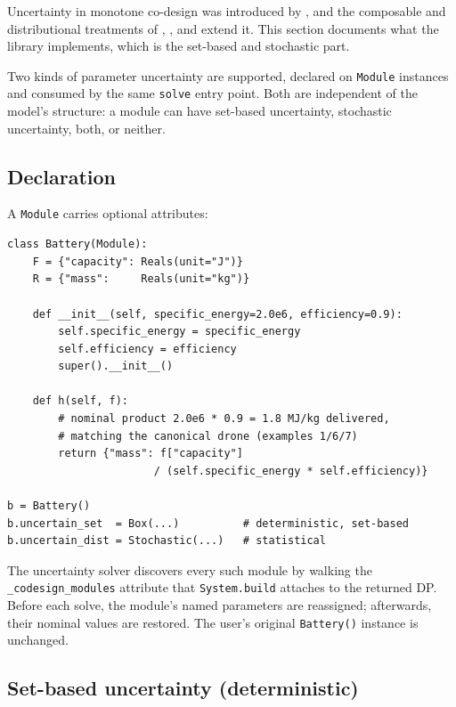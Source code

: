 \documentclass[11pt,a4paper]{article}
\begin{document}
Uncertainty in monotone co-design was introduced by
\citet{censi2017uncertainty}, and the composable and distributional
treatments of
\citet{huang2025composable}, \citet{furter2026symmetric}, and
\citet{huang2026distributional} extend it. This section documents what the
library implements, which is the set-based and stochastic part.

Two kinds of parameter uncertainty are supported, declared on
\texttt{Module} instances and consumed by the same \texttt{solve}
entry point. Both are independent of the model's structure: a module
can have set-based uncertainty, stochastic uncertainty, both, or
neither.

\subsection{Declaration}

A \texttt{Module} carries optional attributes:
\begin{lstlisting}
class Battery(Module):
    F = {"capacity": Reals(unit="J")}
    R = {"mass":     Reals(unit="kg")}

    def __init__(self, specific_energy=2.0e6, efficiency=0.9):
        self.specific_energy = specific_energy
        self.efficiency = efficiency
        super().__init__()

    def h(self, f):
        # nominal product 2.0e6 * 0.9 = 1.8 MJ/kg delivered,
        # matching the canonical drone (examples 1/6/7)
        return {"mass": f["capacity"]
                       / (self.specific_energy * self.efficiency)}

b = Battery()
b.uncertain_set  = Box(...)          # deterministic, set-based
b.uncertain_dist = Stochastic(...)   # statistical
\end{lstlisting}
The uncertainty solver discovers every such module by walking the
\verb|_codesign_modules| attribute that \texttt{System.build} attaches
to the returned DP. Before each solve, the module's named parameters
are reassigned; afterwards, their nominal values are restored. The
user's original \texttt{Battery()} instance is unchanged.

\subsection{Set-based uncertainty (deterministic)}
\end{document}
